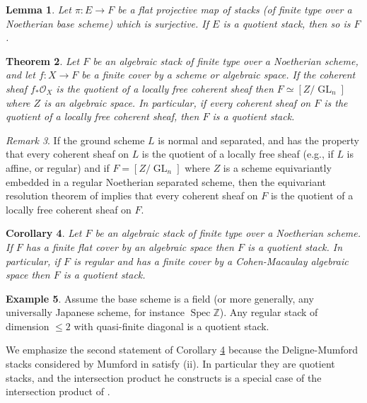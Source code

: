 \documentclass[12pt]{amsart}
\newcommand{\Z}{{\mathbb Z}}
\DeclareMathOperator{\spec}{Spec}
\DeclareMathOperator{\GL}{GL}
\theoremstyle{plain}
\newtheorem  {thm}        {Theorem}     [section]
\newtheorem  {lemma}[thm] {Lemma}
\newtheorem  {cor}  [thm] {Corollary}
\theoremstyle{definition}
\newtheorem  {exml} [thm] {Example}
\theoremstyle{remark}
\newtheorem {remark} [thm]  {Remark}
\begin{document}
\begin{lemma} \label{l.flat}
Let $\pi\colon E\to F$ be a flat projective map of stacks
(of finite type over a Noetherian base scheme) which is surjective.
If $E$ is a quotient stack, then so is $F$.
\end{lemma}


\begin{thm} \label{thm.coq}
Let $F$ be an algebraic stack of finite type over a Noetherian scheme, and let
$f\colon X \rightarrow F$ be a finite cover by 
a scheme or algebraic space. 
If the coherent sheaf
$f_*{\mathcal O}_X$ is the quotient of a locally free coherent sheaf
then $F \simeq [Z/\GL_n]$ where $Z$ is an algebraic space.
In particular, if every coherent sheaf on $F$ is the quotient of
a locally free coherent sheaf, then $F$ is a quotient stack.
\end{thm}

\begin{remark}
If the ground scheme $L$ is normal and separated, and has the property
that every coherent sheaf on $L$ is the quotient of
a locally free sheaf (e.g., if $L$ is affine, or regular) and
if $F = [Z/\GL_n]$ where $Z$ is a scheme equivariantly
embedded in a regular Noetherian separated scheme, then the equivariant
resolution theorem of \cite{Th} implies 
that every coherent sheaf on $F$
is the quotient of a locally free coherent sheaf on $F$.
\end{remark}

\begin{cor} \label{c.ffc}
Let $F$ be an algebraic stack of finite type over a Noetherian scheme.
If $F$ has a finite flat cover by an algebraic space
then $F$ is a quotient stack.
In particular,
if $F$ is regular and has a finite cover by a Cohen-Macaulay
algebraic space then $F$ is a quotient stack.
\end{cor}

\begin{exml}
\label{e.dimensiontwo}
Assume the base scheme is a field
(or more generally, any universally Japanese scheme,
for instance $\spec \Z$).
Any regular stack of dimension $\le 2$ with quasi-finite diagonal
is a quotient stack.
\end{exml}

We emphasize the second statement of Corollary \ref{c.ffc}
because the Deligne-Mum\-ford stacks considered by Mumford
in \cite{Mumenum} satisfy (ii). In particular they are quotient
stacks, and the intersection product he constructs
is a special case of the intersection product of
\cite{E-G}.
\end{document}
